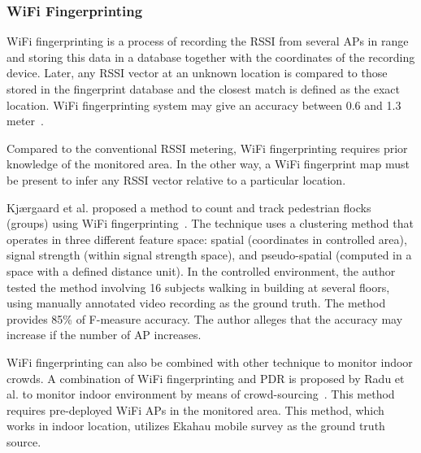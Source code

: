 	

	







	\subsubsection{WiFi Fingerprinting} %
	\label{ssub:wifi_fingerprinting}
	WiFi fingerprinting is a process of recording the \ac{RSSI} from several \ac{AP}s in range and storing this data in a database together with the coordinates of the recording device. Later, any \ac{RSSI} vector at an unknown location is compared to those stored in the fingerprint database and the closest match is defined as the exact location. WiFi fingerprinting system may give an accuracy between 0.6 and 1.3 meter~\cite{Youssef2008}.

	Compared to the conventional \ac{RSSI} metering, WiFi fingerprinting requires prior knowledge of the monitored area. In the other way, a WiFi fingerprint map must be present to infer any \ac{RSSI} vector relative to a particular location.

	Kj{\ae}rgaard et al. proposed a method to count and track pedestrian flocks (groups) using WiFi fingerprinting~\cite{thesis033}. The technique uses a clustering method that operates in three different feature space: spatial (coordinates in controlled area), signal strength (within signal strength space), and pseudo-spatial (computed in a space with a defined distance unit). In the controlled environment, the author tested the method involving 16 subjects walking in building at several floors, using manually annotated video recording as the ground truth. The method provides 85\% of F-measure accuracy. The author alleges that the accuracy may increase if the number of \ac{AP} increases.

	WiFi fingerprinting can also be combined with other technique to monitor indoor crowds. A combination of WiFi fingerprinting and \ac{PDR} is proposed by Radu et al. to monitor indoor environment by means of crowd-sourcing~\cite{thesis020}. This method requires pre-deployed WiFi \ac{AP}s in the monitored area. This method, which works in indoor location, utilizes Ekahau mobile survey as the ground truth source.

